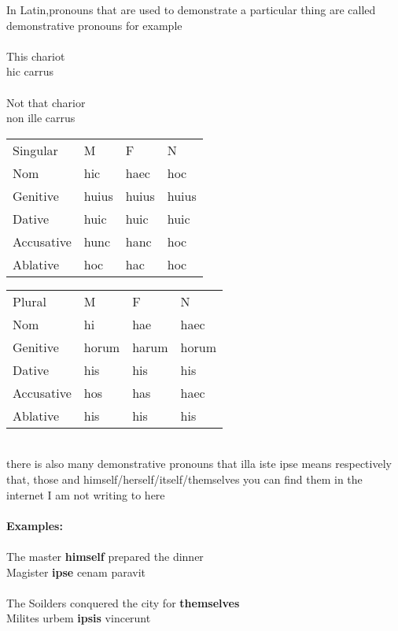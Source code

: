 In Latin,pronouns that are used to demonstrate a particular
thing are called demonstrative pronouns for example \\ \\
This chariot \\ 
hic carrus \\ \\ 
Not that charior \\ 
non ille carrus
\begin{table}[!htb]
  \begin{center}
    \begin{tabular}{llll}
      Singular & M & F & N \\ 
      Nom & hic & haec & hoc \\  
      Genitive & huius & huius & huius \\ 
      Dative & huic & huic & huic \\ 
      Accusative & hunc & hanc & hoc \\ 
      Ablative & hoc & hac & hoc
    \end{tabular}
  \end{center}
  \begin{center}
    \begin{tabular}{llll}
      Plural & M & F & N \\ 
      Nom & hi & hae & haec \\  
      Genitive & horum & harum & horum \\ 
      Dative & his & his & his \\ 
      Accusative & hos & has & haec \\ 
      Ablative & his & his & his
    \end{tabular}
  \end{center}
\end{table} \\ 
there is also many demonstrative pronouns that illa iste ipse 
means respectively that, those and himself/herself/itself/themselves
you can find them in the internet I am not writing to here \\\\ 
{\Huge{\textbf{Examples:}}} \\ \\
The master \textbf{himself} prepared the dinner \\ 
Magister \textbf{ipse} cenam paravit \\  \\
The Soilders conquered the city for \textbf{themselves} \\ 
Milites urbem \textbf{ipsis} vincerunt

